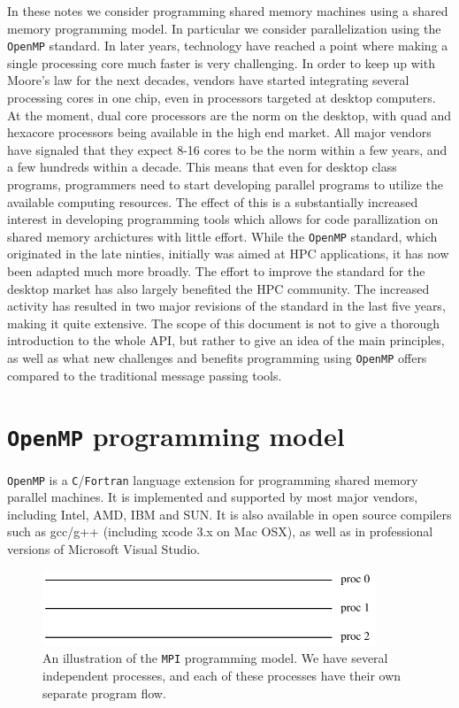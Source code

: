 \documentclass[twoside, 11pt, a4paper]{article}
\begin{document}
In these notes we consider programming shared memory machines using a shared memory programming model.
In particular we consider parallelization using the \texttt{OpenMP} standard.
In later years, technology have reached a point where making a single processing core 
much faster is very challenging. In order to keep 
up with Moore's law for the next decades, vendors have started integrating several 
processing cores in one chip, even in processors targeted at desktop computers.
At the moment, dual core processors are the norm on the desktop, with quad and
hexacore processors being available in the high end market. All major vendors
have signaled that they expect 8-16 cores to be the norm within a few years, and
a few hundreds within a decade.
This means that even for desktop class programs, programmers need to start developing parallel
programs to utilize the available computing resources. The effect of this is a
substantially increased interest in developing programming tools 
which allows for code parallization on shared memory archictures with little effort.
While the \texttt{OpenMP} standard, which originated in the late ninties, initially was
aimed at HPC applications, it has now been adapted much more broadly. 
The effort to improve the standard for the desktop market has also largely benefited the 
HPC community. The increased activity has resulted in two major revisions of the standard 
in the last five years, making it quite extensive. The scope of this document is not to give 
a thorough introduction to the whole API, but rather to give an idea of the main principles,
as well as what new challenges and benefits programming using \texttt{OpenMP} offers compared to the
traditional message passing tools.
\newpage
\section{\texttt{OpenMP} programming model}
\texttt{OpenMP} is a \texttt{C}/\texttt{Fortran} language extension for programming shared memory parallel machines.
It is implemented and supported by most major vendors, including Intel, AMD, IBM and SUN.
It is also available in open source compilers such as gcc/g++ (including xcode 3.x on Mac OSX), 
as well as in professional versions of Microsoft Visual Studio.

\begin{figure}[ht]
	\begin{center}
		\includegraphics[width=10cm]{mpi}
	\end{center}
	\caption{An illustration of the \texttt{MPI} programming model. We have several independent
			 processes, and each of these processes have their own separate program flow.}
	\label{fig:mpi}
\end{figure}
\end{document}

